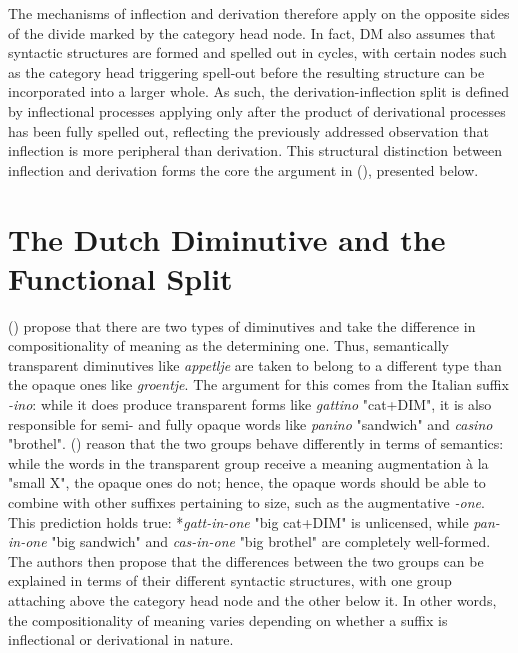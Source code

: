 The mechanisms of inflection and derivation therefore apply on the opposite sides of the divide marked by the category head node. In fact, DM also assumes that syntactic structures are formed and spelled out in cycles, with certain nodes such as the category head triggering spell-out before the resulting structure can be incorporated into a larger whole. As such, the derivation-inflection split is defined by inflectional processes applying only after the product of derivational processes has been fully spelled out, reflecting the previously addressed observation that inflection is more peripheral than derivation. This structural distinction between inflection and derivation forms the core the argument in \citeauthor{DeBelder+etal+2014} (\citeyear{DeBelder+etal+2014}), presented below.

\section{The Dutch Diminutive and the Functional Split}
\label{sec:3-split-dim}
\citeauthor{DeBelder+etal+2014} (\citeyear{DeBelder+etal+2014}) propose that there are two types of diminutives and take the difference in compositionality of meaning as the determining one. Thus, semantically transparent diminutives like \textit{appetlje} are taken to belong to a different type than the opaque ones like \textit{groentje}. The argument for this comes from the Italian suffix \textit{-ino}: while it does produce transparent forms like \textit{gattino} "cat+DIM", it is also responsible for semi- and fully opaque words like \textit{panino} "sandwich" and \textit{casino} "brothel". \citeauthor{DeBelder+etal+2014} (\citeyear{DeBelder+etal+2014}) reason that the two groups behave differently in terms of semantics: while the words in the transparent group receive a meaning augmentation à la "small X", the opaque ones do not; hence, the opaque words should be able to combine with other suffixes pertaining to size, such as the augmentative \textit{-one}. This prediction holds true: *\textit{gatt-in-one} "big cat+DIM" is unlicensed, while \textit{pan-in-one} "big sandwich" and \textit{cas-in-one} "big brothel" are completely well-formed. The authors then propose that the differences between the two groups can be explained in terms of their different syntactic structures, with one group attaching above the category head node and the other below it. In other words, the compositionality of meaning varies depending on whether a suffix is inflectional or derivational in nature.

